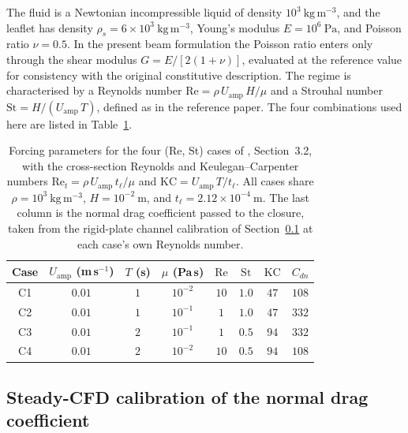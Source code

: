 \noindent
The fluid is a Newtonian incompressible liquid of density $10^{3}~\mathrm{kg\,m^{-3}}$, and the leaflet has density $\rho_{s} = 6\times10^{3}~\mathrm{kg\,m^{-3}}$, Young's modulus $E = 10^{6}~\mathrm{Pa}$, and Poisson ratio $\nu = 0.5$. In the present beam formulation the Poisson ratio enters only through the shear modulus $G = E/[2(1+\nu)]$, evaluated at the reference value for consistency with the original constitutive description. The regime is characterised by a Reynolds number $\mathrm{Re} = \rho\,U_{\mathrm{amp}}\,H / \mu$ and a Strouhal number $\mathrm{St} = H / (U_{\mathrm{amp}}\,T)$, defined as in the reference paper. The four combinations used here are listed in Table~\ref{tab:leaflet_cases}.

\begin{table}[!ht]
\centering
\small
\caption{Forcing parameters for the four (Re, St) cases of \citet{zhang_immersed_2007}, Section~3.2, with the cross-section Reynolds and Keulegan--Carpenter numbers $\mathrm{Re}_{t} = \rho\,U_{\mathrm{amp}}\,t_{\ell}/\mu$ and $\mathrm{KC} = U_{\mathrm{amp}}\,T/t_{\ell}$. All cases share $\rho = 10^{3}~\mathrm{kg\,m^{-3}}$, $H = 10^{-2}~\mathrm{m}$, and $t_{\ell} = 2.12\times10^{-4}~\mathrm{m}$. The last column is the normal drag coefficient passed to the closure, taken from the rigid-plate channel calibration of Section~\ref{sec:leaflet_cd_calibration} at each case's own Reynolds number.}
\label{tab:leaflet_cases}
\setlength{\tabcolsep}{6pt}
\renewcommand{\arraystretch}{1.15}
\begin{tabular}{c c c c c c c c}
\toprule
Case & $U_{\mathrm{amp}}$ (m\,s$^{-1}$) & $T$ (s) & $\mu$ (Pa\,s) & $\mathrm{Re}$ & $\mathrm{St}$ & $\mathrm{KC}$ & $C_{dn}$ \\
\midrule
C1 & $0.01$ & $1$ & $10^{-2}$ & $10$ & $1.0$ & $47$ & $108$ \\
C2 & $0.01$ & $1$ & $10^{-1}$ & $1$  & $1.0$ & $47$ & $332$ \\
C3 & $0.01$ & $2$ & $10^{-1}$ & $1$  & $0.5$ & $94$ & $332$ \\
C4 & $0.01$ & $2$ & $10^{-2}$ & $10$ & $0.5$ & $94$ & $108$ \\
\bottomrule
\end{tabular}
\end{table}

\subsection{Steady-CFD calibration of the normal drag coefficient}
\label{sec:leaflet_cd_calibration}

